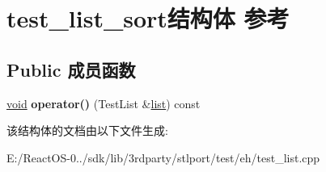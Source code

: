 \hypertarget{structtest__list__sort}{}\section{test\+\_\+list\+\_\+sort结构体 参考}
\label{structtest__list__sort}
\subsection*{Public 成员函数}
\begin{DoxyCompactItemize}
\item 
\mbox{\label{structtest__list__sort_a569fa3b901805a90fb27698a682b1478}} 
\hyperlink{interfacevoid}{void} {\bfseries operator()} (Test\+List \&\hyperlink{classlist}{list}) const
\end{DoxyCompactItemize}


该结构体的文档由以下文件生成\+:\begin{DoxyCompactItemize}
\item 
E\+:/\+React\+O\+S-\/0../sdk/lib/3rdparty/stlport/test/eh/test\+\_\+list.\+cpp\end{DoxyCompactItemize}

